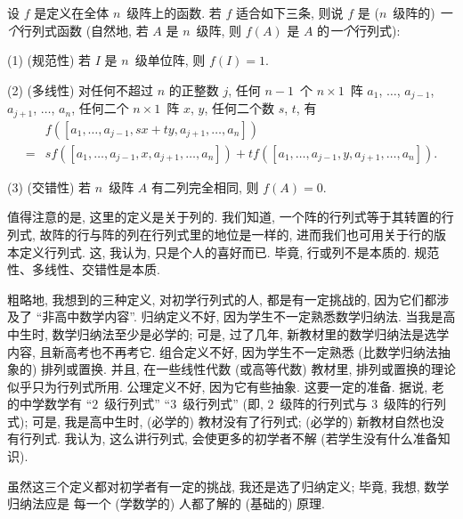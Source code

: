 \begin{definition}[公理定义]
    设 \(f\) 是定义在全体 \(n\)~级阵上的函数.
    若 \(f\) 适合如下三条, 则说
    \(f\) 是 (\(n\)~级阵的) \emph{一个}行列式函数
    (自然地, 若 \(A\) 是 \(n\)~级阵,
    则 \(f(A)\) 是 \(A\) 的\emph{一个}行列式):

    (1)
    (规范性)
    若 \(I\) 是 \(n\)~级单位阵,
    则 \(f(I) = 1\).

    (2)
    (多线性)
    对任何不超过 \(n\) 的正整数 \(j\),
    任何 \(n-1\)~个 \(n \times 1\)~阵
    \(a_1\), \(\dots\), \(a_{j-1}\),
    \(a_{j+1}\), \(\dots\), \(a_n\),
    任何二个 \(n \times 1\)~阵 \(x\), \(y\),
    任何二个数 \(s\), \(t\),
    有
    \begin{align*}
             & f
            {([a_1, \dots, a_{j-1}, sx + ty,
                        a_{j+1}, \dots, a_n])}
        \\
        = {} &
        s
        f {([a_1, \dots, a_{j-1}, x, a_{j+1}, \dots, a_n])}
        +
        t
        f {([a_1, \dots, a_{j-1}, y, a_{j+1}, \dots, a_n])}.
    \end{align*}

    (3)
    (交错性)
    若 \(n\)~级阵 \(A\) 有二列完全相同,
    则 \(f {(A)} = 0\).
\end{definition}

值得注意的是, 这里的定义是关于列的.
我们知道, 一个阵的行列式等于其转置的行列式,
故阵的行与阵的列在行列式里的地位是一样的,
进而我们也可用关于行的版本定义行列式.
这, 我认为, 只是个人的喜好而已.
毕竟, 行或列不是本质的.
规范性、多线性、交错性是本质.

粗略地, 我想到的三种定义,
对初学行列式的人,
都是有一定挑战的,
因为它们都涉及了 ``非高中数学内容''.
归纳定义不好, 因为学生不一定熟悉数学归纳法.
当我是高中生时, 数学归纳法至少是必学的;
可是, 过了几年, 新教材里的数学归纳法是选学内容,
且新高考也不再考它.
组合定义不好, 因为学生不一定熟悉
(比数学归纳法抽象的) 排列或置换.
并且,
在一些线性代数 (或高等代数) 教材里,
排列或置换的理论似乎只为行列式所用.
公理定义不好, 因为它有些抽象.
这要一定的准备.
据说, 老的中学数学有
``\(2\)~级行列式'' ``\(3\)~级行列式''
(即, \(2\)~级阵的行列式与 \(3\)~级阵的行列式);
可是, 我是高中生时, (必学的) 教材没有了行列式;
(必学的) 新教材自然也没有行列式.
我认为, 这么讲行列式, 会使更多的初学者不解
(若学生没有什么准备知识).

虽然这三个定义都对初学者有一定的挑战,
我还是选了归纳定义;
毕竟, 我想, 数学归纳法应是%
每一个 (学数学的) 人都了解的 (基础的) 原理.

